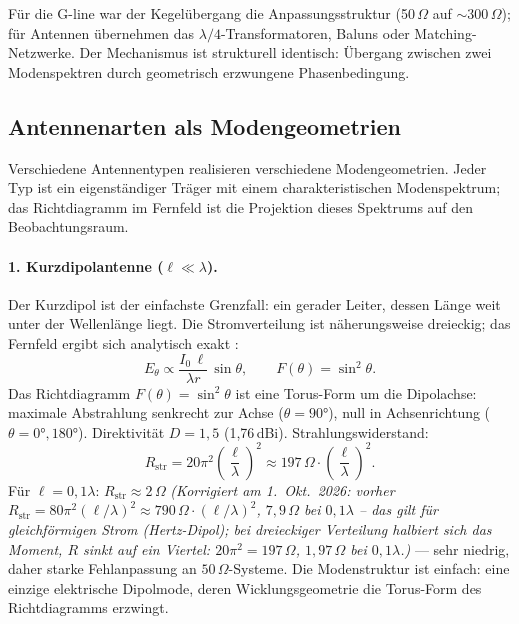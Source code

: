 Für die G-line war der Kegelübergang die Anpassungsstruktur (50\,$\Omega$
auf ${\sim}300\,\Omega$); für Antennen übernehmen das $\lambda/4$-Transformatoren,
Baluns oder Matching-Netzwerke. Der Mechanismus ist strukturell identisch:
Übergang zwischen zwei Modenspektren durch geometrisch erzwungene
Phasenbedingung.

\subsection*{Antennenarten als Modengeometrien}

Verschiedene Antennentypen realisieren verschiedene Modengeometrien.
Jeder Typ ist ein eigenständiger Träger mit einem charakteristischen
Modenspektrum; das Richtdiagramm im Fernfeld ist die Projektion dieses
Spektrums auf den Beobachtungsraum.

\paragraph{1. Kurzdipolantenne ($\ell \ll \lambda$).}

Der Kurzdipol ist der einfachste Grenzfall: ein gerader Leiter, dessen
Länge weit unter der Wellenlänge liegt. Die Stromverteilung ist näherungsweise
dreieckig; das Fernfeld ergibt sich analytisch exakt \EM:
\[
  E_\theta \propto \frac{I_0\,\ell}{\lambda r}\,\sin\theta,
  \qquad
  F(\theta) = \sin^2\theta.
\]
Das Richtdiagramm $F(\theta) = \sin^2\theta$ ist eine Torus-Form um die
Dipolachse: maximale Abstrahlung senkrecht zur Achse ($\theta = 90°$),
null in Achsenrichtung ($\theta = 0°, 180°$). Direktivität $D = 1{,}5$
(1,76\,dBi). Strahlungswiderstand:
\[
  R_\mathrm{str} = 20\pi^2\left(\frac{\ell}{\lambda}\right)^2 \approx 197\,\Omega
  \cdot \left(\frac{\ell}{\lambda}\right)^2.
\]
Für $\ell = 0{,}1\lambda$: $R_\mathrm{str} \approx 2\,\Omega$
\textit{(Korrigiert am 1.~Okt.~2026: vorher $R_\mathrm{str} = 80\pi^2(\ell/\lambda)^2 \approx 790\,\Omega\cdot(\ell/\lambda)^2$, $7{,}9\,\Omega$ bei $0{,}1\lambda$ -- das gilt für gleichförmigen Strom (Hertz-Dipol); bei dreieckiger Verteilung halbiert sich das Moment, $R$ sinkt auf ein Viertel: $20\pi^2 = 197\,\Omega$, $1{,}97\,\Omega$ bei $0{,}1\lambda$.)} --- sehr
niedrig, daher starke Fehlanpassung an $50\,\Omega$-Systeme. Die
Modenstruktur ist einfach: eine einzige elektrische Dipolmode, deren
Wicklungsgeometrie die Torus-Form des Richtdiagramms erzwingt.

